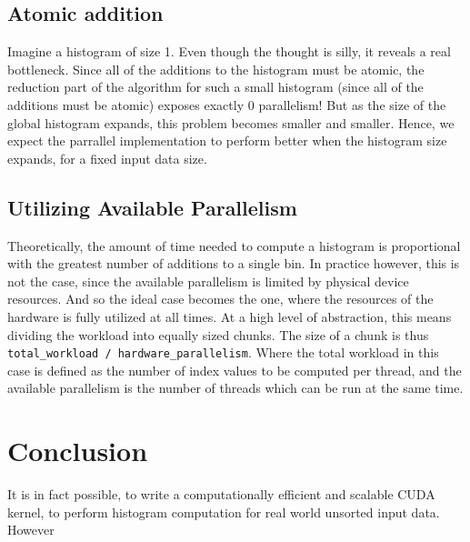 \documentclass[12pt, a4paper, hidelinks]{article}
\renewcommand{\tt}[1]{\texttt{#1}}
\begin{document}
\subsection{Atomic addition}
Imagine a histogram of size 1. Even though the thought is silly,
it reveals a real bottleneck. Since all of the additions to the
histogram must be atomic, the reduction part of the algorithm for
such a small histogram (since all of the additions must be atomic)
exposes exactly 0 parallelism! But as the size of the global histogram
expands, this problem becomes smaller and smaller.
Hence, we expect the parrallel implementation to perform better when the
histogram size expands, for a fixed input data size.

\subsection{Utilizing Available Parallelism}
Theoretically, the amount of time needed to compute a histogram is
proportional with the greatest number of additions to a single bin.
In practice however, this is not the case,
since the available parallelism is limited by physical device resources.
And so the ideal case becomes the one,
where the resources of the hardware is fully utilized at all times.
At a high level of abstraction, this means dividing the workload into
equally sized chunks. The size of a chunk is thus
\tt{total\_workload / hardware\_parallelism}.
Where the total workload in this case is defined as the number of index values
to be computed per thread, and the available parallelism is the number of
threads which can be run at the same time.

\section{Conclusion}
It is in fact possible, to write a computationally efficient and scalable CUDA kernel,
to perform histogram computation for real world unsorted input data.
However

\end{document}

